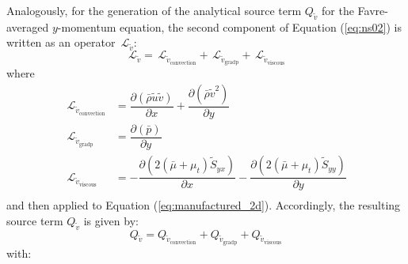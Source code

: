 \documentclass[10pt]{article}
\newcommand{\Diff}[2] {\dfrac{\partial\left( #1\right)}{\partial #2}}
\newcommand{\Lo}{\,\mathcal{L}}
\newcommand{\brho}{\bar{\rho}}
\newcommand{\bp}{\bar{p}}
\newcommand{\tu}{\tilde{u}}
\newcommand{\tv}{\tilde{v}}
\newcommand{\tS}{\tilde{S}}
\newcommand{\bmu}{\bar{\mu}}
\begin{document}
Analogously, for the generation of the analytical source term $Q_{\tv}$ for the Favre-averaged $y$-momentum equation, the second component of Equation  (\ref{eq:ns02})  is written as an  operator $\Lo_{\tv}$:
\begin{equation*}
 \Lo_{\tv}= \Lo_{\tv_\text{convection}} + \Lo_{\tv_\text{gradp}}+\Lo_{\tv_\text{viscous}}
\end{equation*}
where
\begin{equation}
\begin{split}\label{eq:v_operators}
\Lo_{\tv_\text{convection}}&=  \Diff{\brho \tu\tv}{x}+\Diff{\brho \tv^2}{y} \\
\Lo_{\tv_\text{gradp}}&= \Diff{\bp}{y} \\
\Lo_{\tv_\text{viscous}}&=-\Diff{2(\bmu+\mu_t)\tS_{yx}}{x}-\Diff{2(\bmu+\mu_t)\tS_{yy}}{y}\\
\end{split}
\end{equation}
and then applied to Equation  (\ref{eq:manufactured_2d}). Accordingly, the resulting source term $Q_{\tv}$ is given by:
\begin{equation*}
Q_{\tv}	=Q_{\tv_\text{convection}} + Q_{\tv_\text{gradp}}+Q_{\tv_\text{viscous}}
\end{equation*}
with: 
\end{document}
